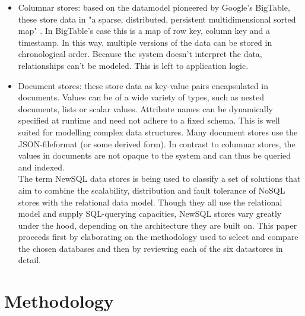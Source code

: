 \documentclass{IEEEtran}
\begin{document}
\begin{itemize}
\item Columnar stores: based on the datamodel pioneered by Google's BigTable, these store data in "a sparse, distributed, persistent multidimensional sorted map" \cite{chang2008bigtable}. In BigTable's case this is a map of row key, column key and a timestamp. In this way, multiple versions of the data can be stored in chronological order. Because the system doesn't interpret the data, relationships can't be modeled. This is left to application logic\cite{hecht2011nosql}.
\item Document stores: these store data as key-value pairs encapsulated in documents. Values can be of a wide variety of types, such as nested documents, lists or scalar values. Attribute names can be dynamically specified at runtime and need not adhere to a fixed schema\cite{cattell2011scalable}. This is well suited for modelling complex data structures. Many document stores use the JSON-fileformat (or some derived form). In contrast to columnar stores, the values in documents are not opaque to the system and can thus be queried and indexed\cite{hecht2011nosql}.\\
The term NewSQL data stores is being used to classify a set of solutions that aim to combine the scalability, distribution and fault tolerance of NoSQL stores with the relational data model. Though they all use the relational model and supply SQL-querying capacities, NewSQL stores vary greatly under the hood, depending on the architecture they are built on\cite{grolinger2013data}. This paper proceeds first by elaborating on the methodology used to select and compare the chosen databases and then by reviewing each of the six datastores in detail.
\end{itemize}

\section{Methodology}
\end{document}

